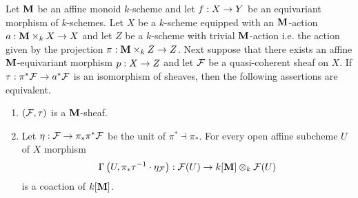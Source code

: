 \begin{proposition}\label{proposition:equivariant_sheaves_on_schemes_with_trivial_actions}
Let $\mathbf{M}$ be an affine monoid $k$-scheme and let $f:X\rightarrow Y$ be an equivariant morphism of $k$-schemes. Let $X$ be a $k$-scheme equipped with an $\mathbf{M}$-action $a:\mathbf{M}\times_kX\rightarrow X$ and let $Z$ be a $k$-scheme with trivial $\mathbf{M}$-action i.e. the action given by the projection $\pi:\mathbf{M}\times_kZ\rightarrow Z$. Next suppose that there exists an affine $\mathbf{M}$-equivariant morphism $p:X\rightarrow Z$ and let ${\mathcal F}$ be a quasi-coherent sheaf on $X$. If $\tau:\pi^*{\mathcal F}\rightarrow a^*{\mathcal F}$ is an isomorphism of sheaves, then the following assertions are equivalent.
\begin{enumerate}[label= \emph{\textbf{(\roman*)}}, leftmargin=3.0em]
\item $({\mathcal F},\tau)$ is a $\mathbf{M}$-sheaf.
\item Let $\eta:{\mathcal F}\rightarrow \pi_*\pi^*{\mathcal F}$ be the unit of $\pi^* \dashv \pi_*$. For every open affine subcheme $U$ of $X$ morphism
$$\Gamma\left(U,\pi_*\tau^{-1}\cdot \eta_{{\mathcal F}}\right):{\mathcal F}(U)\rightarrow k[\mathbf{M}]\otimes_k{\mathcal F}(U)$$
is a coaction of $k[\mathbf{M}]$.
\end{enumerate}
\end{proposition}
